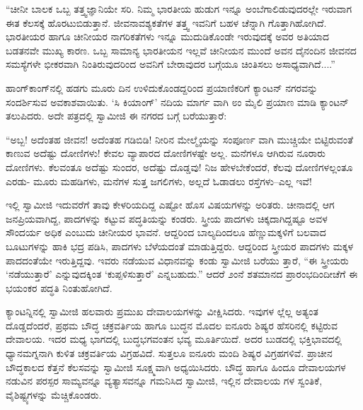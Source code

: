 “ಚೀನೀ ಬಾಲಕ ಒಬ್ಬ ತತ್ತ್ವಜ್ಞಾನಿಯೇ ಸರಿ. ನಿಮ್ಮ ಭಾರತೀಯ ಹುಡುಗ ಇನ್ನೂ ಅಂಬೆಗಾಲಿಡುವುದರಲ್ಲೇ ಇರುವಾಗ ಈತ ಕೆಲಸಕ್ಕೆ ಹೊರಟುಬಿಡುತ್ತಾನೆ. ಜೀವನಾವಶ್ಯಕತೆಗಳ ತತ್ತ್ವ ಇವನಿಗೆ ಬಹಳ ಚೆನ್ನಾಗಿ ಗೊತ್ತಾಗಿಹೋಗಿದೆ. ಭಾರತೀಯರ ಹಾಗೂ ಚೀನೀಯರ ನಾಗರಿಕತೆಗಳು ಇನ್ನೂ ಮುದುಡಿಕೊಂಡೇ ಇರುವುದಕ್ಕೆ ಅವರ ಅತಿಯಾದ ಬಡತನವೇ ಮುಖ್ಯ ಕಾರಣ. ಒಬ್ಬ ಸಾಮಾನ್ಯ ಭಾರತೀಯನ ಇಲ್ಲವೆ ಚೀನೀಯನ ಮುಂದೆ ಅವನ ದೈನಂದಿನ ಜೀವನದ ಸಮಸ್ಯೆಗಳೇ ಭೀಕರವಾಗಿ ನಿಂತಿರುವುದರಿಂದ ಅವನಿಗೆ ಬೇರಾವುದರ ಬಗ್ಗೆಯೂ ಚಿಂತಿಸಲು ಅಸಾಧ್ಯವಾಗಿದೆ....”

ಹಾಂಗ್​ಕಾಂಗ್​ನಲ್ಲಿ ಹಡಗು ಮೂರು ದಿನ ಉಳಿದುಕೊಂಡದ್ದರಿಂದ ಪ್ರಯಾಣಿಕರಿಗೆ ಕ್ಯಾಂಟನ್ ನಗರವನ್ನು ಸಂದರ್ಶಿಸುವ ಅವಕಾಶವಾಯಿತು. ‘ಸಿ ಕಿಯಾಂಗ್​’ ನದಿಯ ಮಾರ್ಗ ವಾಗಿ ೮ಂ ಮೈಲಿ ಪ್ರಯಾಣ ಮಾಡಿ ಕ್ಯಾಂಟನ್ ತಲುಪಿದರು. ಅದೇ ಪತ್ರದಲ್ಲಿ ಸ್ವಾಮೀಜಿ ಈ ನಗರದ ಬಗ್ಗೆ ಬರೆಯುತ್ತಾರೆ:

“ಅಬ್ಬ! ಅದೆಂತಹ ಜೀವನ! ಅದೆಂತಹ ಗಡಿಬಿಡಿ! ನೀರಿನ ಮೇಲ್ಮೈಯನ್ನು ಸಂಪೂರ್ಣ ವಾಗಿ ಮುಚ್ಚಿಯೇ ಬಿಟ್ಟಿರುವಂತೆ ಕಾಣುವ ಅದೆಷ್ಟು ದೋಣಿಗಳು! ಕೇವಲ ವ್ಯಾಪಾರದ ದೋಣಿಗಳಷ್ಟೇ ಅಲ್ಲ. ಮನೆಗಳೂ ಆಗಿರುವ ನೂರಾರು ದೋಣಿಗಳು. ಕೆಲವಂತೂ ಅದೆಷ್ಟು ಸುಂದರ, ಅದೆಷ್ಟು ದೊಡ್ಡವು! ನಿಜ ಹೇಳಬೇಕೆಂದರೆ, ಕೆಲವು ದೋಣಿಗಳಲ್ಲಂತೂ ಎರಡು- ಮೂರು ಮಹಡಿಗಳು, ಮನೆಗಳ ಸುತ್ತ ಜಗಲಿಗಳು, ಅಲ್ಲದೆ ಓಡಾಡಲು ರಸ್ತೆಗಳು–ಎಲ್ಲ ಇವೆ!

ಇಲ್ಲಿ ಸ್ವಾಮೀಜಿ ಇದುವರೆಗೆ ತಾವು ಕೇಳರಿಯದಿದ್ದ ಎಷ್ಟೋ ಹೊಸ ವಿಷಯಗಳನ್ನು ಅರಿತರು. ಚೀನಾದಲ್ಲಿ ಆಗ ಜನಪ್ರಿಯವಾಗಿದ್ದ, ಪಾದಗಳನ್ನು ಕಟ್ಟುವ ಪದ್ಧತಿಯನ್ನು ಕಂಡರು. ಸ್ತ್ರೀಯ ಪಾದಗಳು ಚಿಕ್ಕದಾಗಿದ್ದಷ್ಟೂ ಅವಳ ಸೌಂದರ್ಯ ಅಧಿಕ ಎಂಬುದು ಚೀನೀಯರ ಭಾವನೆ. ಆದ್ದರಿಂದ ಬಾಲ್ಯದಿಂದಲೂ ಹೆಣ್ಣುಮಕ್ಕಳಿಗೆ ಬಲವಾದ ಬೂಟುಗಳನ್ನು ಹಾಕಿ ಭದ್ರ ಪಡಿಸಿ, ಪಾದಗಳು ಬೆಳೆಯದಂತೆ ಮಾಡುತ್ತಿದ್ದರು. ಆದ್ದರಿಂದ ಸ್ತ್ರೀಯರ ಪಾದಗಳು ಮಕ್ಕಳ ಪಾದದಂತೆಯೇ ಇರುತ್ತಿದ್ದವು. ಇವರು ನಡೆಯುವ ವಿಧಾನವನ್ನು ಕಂಡು ಸ್ವಾಮೀಜಿ ಬರೆಯು ತ್ತಾರೆ, “ಈ ಸ್ತ್ರೀಯರು ‘ನಡೆಯುತ್ತಾರೆ’ ಎನ್ನುವುದಕ್ಕಿಂತ ‘ಕುಪ್ಪಳಿಸುತ್ತಾರೆ’ ಎನ್ನಬಹುದು.” ಆದರೆ ೨ಂನೆ ಶತಮಾನದ ಪ್ರಾರಂಭದಿಂದೀಚೆಗೆ ಈ ಭಯಂಕರ ಪದ್ಧತಿ ನಿಂತುಹೋಗಿದೆ.

ಕ್ಯಾಂಟನ್ನಿನಲ್ಲಿ ಸ್ವಾಮೀಜಿ ಹಲವಾರು ಪ್ರಮುಖ ದೇವಾಲಯಗಳನ್ನು ವೀಕ್ಷಿಸಿದರು. ಇವುಗಳ ಲ್ಲೆಲ್ಲ ಅತ್ಯಂತ ದೊಡ್ಡದೆಂದರೆ, ಪ್ರಥಮ ಬೌದ್ಧ ಚಕ್ರವರ್ತಿಯ ಹಾಗೂ ಬುದ್ಧನ ಮೊದಲ ಐನೂರು ಶಿಷ್ಯರ ಹೆಸರಿನಲ್ಲಿ ಕಟ್ಟಿರುವ ದೇವಾಲಯ. ಇದರ ಮಧ್ಯ ಭಾಗದಲ್ಲಿ ಬುದ್ಧಭಗವಂತನ ಭವ್ಯ ಮೂರ್ತಿಯಿದೆ. ಅದರ ಬುಡದಲ್ಲಿ ಭಕ್ತಿಭಾವದಲ್ಲಿ ಧ್ಯಾನಮಗ್ನನಾಗಿ ಕುಳಿತ ಚಕ್ರವರ್ತಿಯ ವಿಗ್ರಹವಿದೆ. ಸುತ್ತಲೂ ಐನೂರು ಮಂದಿ ಶಿಷ್ಯರ ವಿಗ್ರಹಗಳಿವೆ. ಪ್ರಾಚೀನ ಬೌದ್ಧಕಾಲದ ಕೆತ್ತನೆ ಕೆಲಸವನ್ನು ಸ್ವಾಮೀಜಿ ಸೂಕ್ಷ್ಮವಾಗಿ ಅಧ್ಯಯಿಸಿದರು. ಬೌದ್ಧ ಹಾಗೂ ಹಿಂದೂ ದೇವಾಲಯಗಳ ನಡುವಿನ ಪರಸ್ಪರ ಸಾಮ್ಯವನ್ನೂ ವ್ಯತ್ಯಾಸವನ್ನೂ ಗಮನಿಸಿದ ಸ್ವಾಮೀಜಿ, ಇಲ್ಲಿನ ದೇವಾಲಯ ಗಳ ಸ್ವಂತಿಕೆ, ವೈಶಿಷ್ಟ್ಯಗಳನ್ನು ಮೆಚ್ಚಿಕೊಂಡರು.

